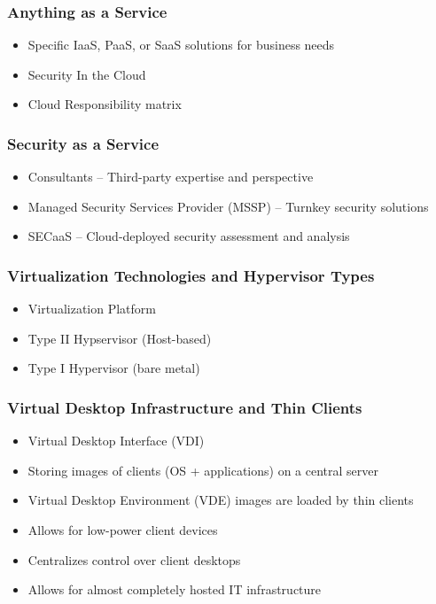 		\subsubsection {Anything as a Service}
			\begin{itemize}
				\item Specific IaaS, PaaS, or SaaS solutions for business needs
				\item Security In the Cloud
				\item Cloud Responsibility matrix
			\end{itemize}
		\subsubsection {Security as a Service}
			\begin{itemize}
				\item Consultants -- Third-party expertise and perspective
				\item Managed Security Services Provider (MSSP)
					-- Turnkey security solutions
				\item SECaaS -- Cloud-deployed security assessment and analysis
			\end{itemize}
		\subsubsection {Virtualization Technologies and Hypervisor Types}
			\begin{itemize}
				\item Virtualization Platform
				\item Type II Hypservisor (Host-based)
				\item Type I Hypervisor (bare metal)
			\end{itemize}
		\subsubsection {Virtual Desktop Infrastructure and Thin Clients}
			\begin{itemize}
				\item Virtual Desktop Interface (VDI)
				\item Storing images of clients (OS + applications) on a central server
				\item Virtual Desktop Environment (VDE) images are loaded by thin clients
				\item Allows for low-power client devices
				\item Centralizes control over client desktops
				\item Allows for almost completely hosted IT infrastructure
			\end{itemize}
